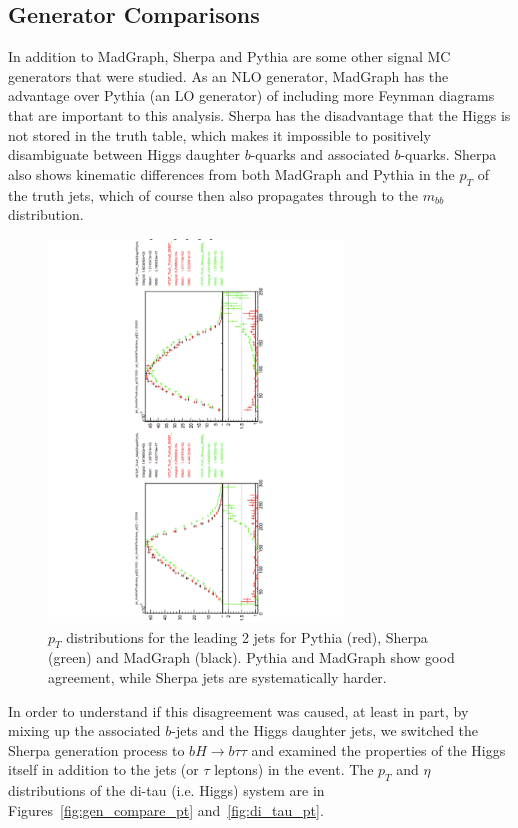 \subsection{Generator Comparisons}
In addition to MadGraph, Sherpa and Pythia are some other signal MC generators that 
were studied.  As an NLO generator, MadGraph has the advantage over Pythia (an LO generator) of including
more Feynman diagrams that are important to this analysis.  Sherpa has the disadvantage that
the Higgs is not stored in the truth table, which makes it impossible to positively
disambiguate between Higgs daughter $b$-quarks and associated $b$-quarks.  Sherpa
also shows kinematic differences from both MadGraph and Pythia in the $p_T$ of the truth
jets, which of course then also propagates through to the $m_{bb}$ distribution.


\begin{figure}
  \center
  \includegraphics[width=0.7\textwidth, angle=270]{MonteCarlo/figures/sig_gen_compare.pdf}
  \caption{$p_T$ distributions for the leading 2 jets for Pythia (red), Sherpa (green) and MadGraph (black).  
  Pythia and MadGraph show good agreement, while Sherpa jets are systematically harder.  \label{fig:sig_gen_compare}}
\end{figure}

In order to understand if this disagreement was caused, at least in part, by
mixing up the associated $b$-jets and the Higgs daughter jets, we switched the Sherpa
generation process to $bH\rightarrow b\tau\tau$ and examined the properties of the
Higgs itself in addition to the jets (or $\tau$ leptons) in the event.  The $p_T$ and 
$\eta$ distributions of the di-tau (i.e. Higgs) system are in Figures~\ref{fig:gen_compare_pt}
and~\ref{fig:di_tau_pt}. 


